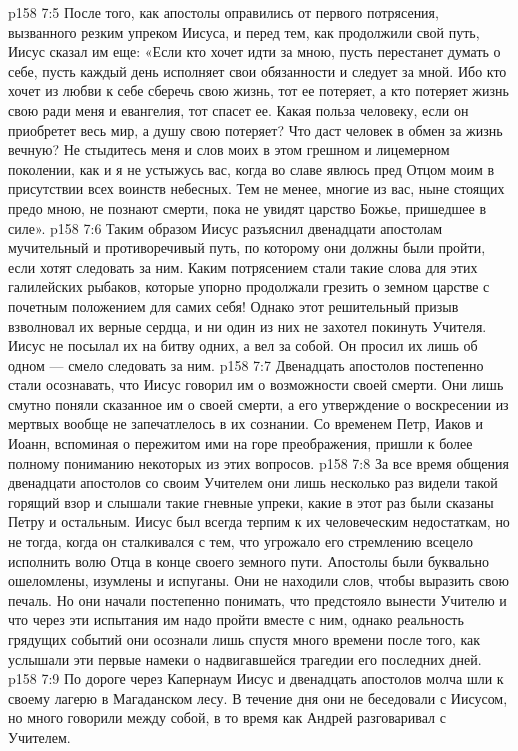 \vs p158 7:5 После того, как апостолы оправились от первого потрясения, вызванного резким упреком Иисуса, и перед тем, как продолжили свой путь, Иисус сказал им еще: «Если кто хочет идти за мною, пусть перестанет думать о себе, пусть каждый день исполняет свои обязанности и следует за мной. Ибо кто хочет из любви к себе сберечь свою жизнь, тот ее потеряет, а кто потеряет жизнь свою ради меня и евангелия, тот спасет ее. Какая польза человеку, если он приобретет весь мир, а душу свою потеряет? Что даст человек в обмен за жизнь вечную? Не стыдитесь меня и слов моих в этом грешном и лицемерном поколении, как и я не устыжусь вас, когда во славе явлюсь пред Отцом моим в присутствии всех воинств небесных. Тем не менее, многие из вас, ныне стоящих предо мною, не познают смерти, пока не увидят царство Божье, пришедшее в силе».
\vs p158 7:6 Таким образом Иисус разъяснил двенадцати апостолам мучительный и противоречивый путь, по которому они должны были пройти, если хотят следовать за ним. Каким потрясением стали такие слова для этих галилейских рыбаков, которые упорно продолжали грезить о земном царстве с почетным положением для самих себя! Однако этот решительный призыв взволновал их верные сердца, и ни один из них не захотел покинуть Учителя. Иисус не посылал их на битву одних, а вел за собой. Он просил их лишь об одном --- смело следовать за ним.
\vs p158 7:7 Двенадцать апостолов постепенно стали осознавать, что Иисус говорил им о возможности своей смерти. Они лишь смутно поняли сказанное им о своей смерти, а его утверждение о воскресении из мертвых вообще не запечатлелось в их сознании. Со временем Петр, Иаков и Иоанн, вспоминая о пережитом ими на горе преображения, пришли к более полному пониманию некоторых из этих вопросов.
\vs p158 7:8 За все время общения двенадцати апостолов со своим Учителем они лишь несколько раз видели такой горящий взор и слышали такие гневные упреки, какие в этот раз были сказаны Петру и остальным. Иисус был всегда терпим к их человеческим недостаткам, но не тогда, когда он сталкивался с тем, что угрожало его стремлению всецело исполнить волю Отца в конце своего земного пути. Апостолы были буквально ошеломлены, изумлены и испуганы. Они не находили слов, чтобы выразить свою печаль. Но они начали постепенно понимать, что предстояло вынести Учителю и что через эти испытания им надо пройти вместе с ним, однако реальность грядущих событий они осознали лишь спустя много времени после того, как услышали эти первые намеки о надвигавшейся трагедии его последних дней.
\vs p158 7:9 По дороге через Капернаум Иисус и двенадцать апостолов молча шли к своему лагерю в Магаданском лесу. В течение дня они не беседовали с Иисусом, но много говорили между собой, в то время как Андрей разговаривал с Учителем.
